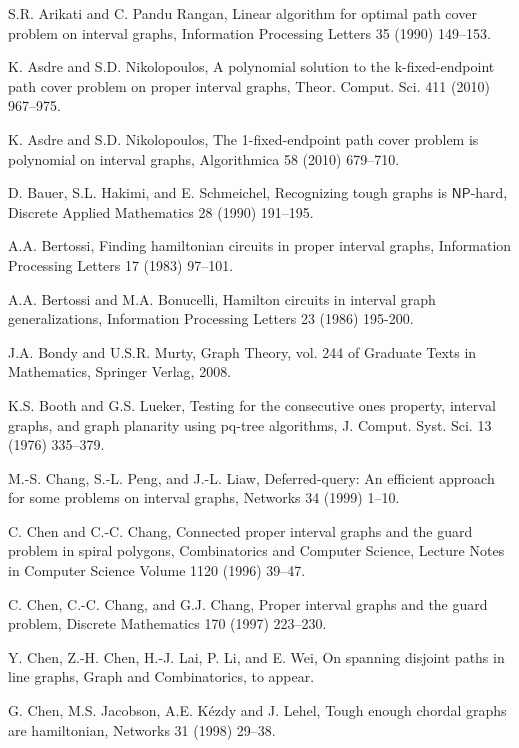 \documentclass{llncs}
\newcommand{\NP}{{\mathsf{NP}}}
\begin{document}
\begin{thebibliography}{10}

S.R. Arikati and C. Pandu Rangan, Linear algorithm for optimal path cover problem on interval graphs, Information Processing Letters 35 (1990) 149--153.

K. Asdre and S.D. Nikolopoulos, A polynomial solution to the k-fixed-endpoint path cover problem on proper interval graphs, Theor. Comput. Sci. 411 (2010) 967--975.

K. Asdre and S.D. Nikolopoulos, The 1-fixed-endpoint path cover problem is polynomial on interval graphs, Algorithmica 58 (2010) 679--710.

D. Bauer, S.L. Hakimi, and E. Schmeichel,
Recognizing tough graphs is $\NP$-hard,
Discrete Applied Mathematics 28 (1990) 191--195.

A.A. Bertossi, Finding hamiltonian circuits in proper interval graphs, Information Processing Letters 17 (1983) 97--101.

A.A. Bertossi and M.A. Bonucelli,
Hamilton circuits in interval graph generalizations,
Information Processing Letters 23 (1986) 195-200.

J.A. Bondy and U.S.R. Murty, Graph Theory, vol. 244 of Graduate Texts in Mathematics, Springer Verlag, 2008.

K.S. Booth and G.S. Lueker, Testing for the consecutive ones property, interval graphs, and graph planarity using pq-tree algorithms, J. Comput. Syst. Sci. 13 (1976) 335--379.

M.-S. Chang, S.-L. Peng, and J.-L. Liaw,
Deferred-query: An efficient approach for some problems on interval graphs, Networks 34 (1999) 1--10.

C. Chen and C.-C. Chang, Connected proper interval graphs and the guard problem in spiral polygons,  Combinatorics and Computer Science, Lecture Notes in Computer Science Volume 1120 (1996) 39--47.

C. Chen, C.-C. Chang, and G.J. Chang, Proper interval graphs and the guard problem, Discrete Mathematics 170 (1997) 223--230.

Y. Chen, Z.-H. Chen, H.-J. Lai, P. Li, and E. Wei, On spanning disjoint paths in line graphs, Graph and Combinatorics, to appear.

G. Chen, M.S. Jacobson, A.E. K\'ezdy and J. Lehel,  Tough enough chordal graphs are hamiltonian, Networks 31 (1998) 29--38.


\end{thebibliography}
\end{document}

